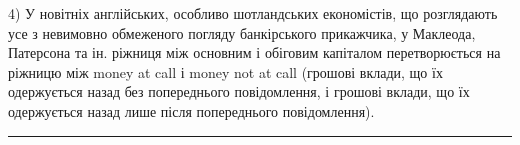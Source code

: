 4) У новітніх англійських, особливо шотландських економістів, що розглядають
усе з невимовно обмеженого погляду банкірського прикажчика,
у Маклеода, Патерсона та ін. ріжниця між основним і обіговим капіталом
перетворюється на ріжницю між money at call і money not at call
(грошові вклади, що їх одержується назад без попереднього повідомлення,
і грошові вклади, що їх одержується назад лише після попереднього
повідомлення).
\pfbreak
